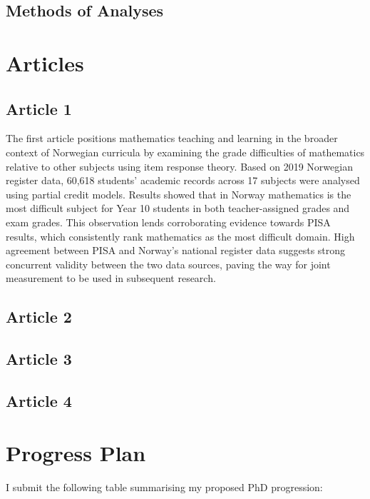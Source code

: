 \documentclass[
    a4paper,                %
    11pt,                   %
    stu,                    %
    donotrepeattitle,       %
    floatsintext,           %
    biblatex,               %
    colorlinks=true,        %
    linkcolor=red,          %
    anchorcolor=black,      %
    citecolor=blue,         %
    urlcolor=blue,          %
    bookmarks=true,         %
    bookmarksopen=false,    %
    bookmarksnumbered=true, %
    dvipsnames              %
]{apa7}
\begin{document}
\subsection{Methods of Analyses}

\section{Articles}

\subsection{Article 1}

The first article positions mathematics teaching and learning in the broader context of Norwegian curricula by examining the grade difficulties of mathematics relative to other subjects using item response theory. Based on 2019 Norwegian register data, 60,618 students' academic records across 17 subjects were analysed using partial credit models. Results showed that in Norway mathematics is the most difficult subject for Year 10 students in both teacher-assigned grades and exam grades. This observation lends corroborating evidence towards PISA results, which consistently rank mathematics as the most difficult domain. High agreement between PISA and Norway's national register data suggests strong concurrent validity between the two data sources, paving the way for joint measurement to be used in subsequent research.

\subsection{Article 2}

\subsection{Article 3}

\subsection{Article 4}

\section{Progress Plan}

I submit the following table summarising my proposed PhD progression:
\end{document}
